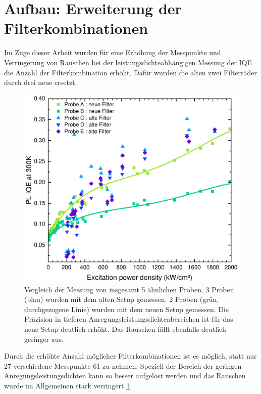 \section{Aufbau: Erweiterung der Filterkombinationen}
\thispagestyle{fancy}

Im Zuge dieser Arbeit wurden für eine Erhöhung der Messpunkte und Verringerung von Rauschen bei der leistungsdichteabhängigen Messung der IQE die Anzahl der Filterkombination erhöht. Dafür wurden die alten zwei Filterräder durch drei neue ersetzt. 
%
\begin{figure}[ht!]
    \centering
    \begin{minipage}[t]{1\linewidth}
        \centering
        \includegraphics[width = 0.49\linewidth]{Bilder/AuswertungNovemeberKorr1VergleichFilter.pdf}
        \caption{Vergleich der Messung von insgesamt 5 ähnlichen Proben. 3 Proben (blau) wurden mit dem alten Setup gemessen. 2 Proben (grün, durchgezogene Linie) wurden mit dem neuen Setup gemessen. Die Präzision in tieferen Anregungsleistungsdichtenbereichen ist für das neue Setup deutlich erhöht. Das Rauschen fällt ebenfalls deutlich geringer aus. }
        \label{fig:vergleichFilter}
    \end{minipage}
\end{figure}
%
\newpage
Durch die erhöhte Anzahl möglicher Filterkombinationen ist es möglich, statt nur 27 verschiedene Messpunkte 61 zu nehmen. Speziell der Bereich der geringen Anregungsleistungsdichten kann so besser aufgelöst werden und das Rauschen wurde im Allgemeinen stark verringert \ref{fig:vergleichFilter}. 
%
